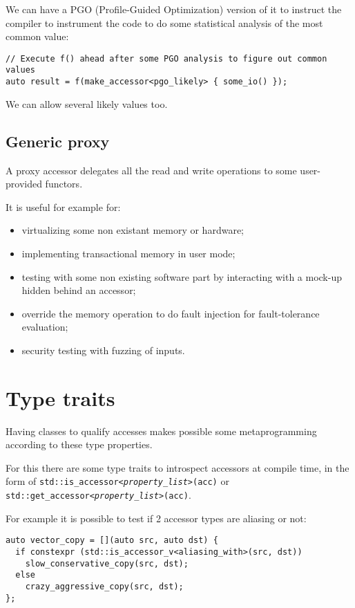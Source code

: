 \documentclass[a4paper]{article}
\begin{document}
We can have a PGO (Profile-Guided Optimization) version of it to
instruct the compiler to instrument the code to do some statistical
analysis of the most common value:
\begin{lstlisting}
// Execute f() ahead after some PGO analysis to figure out common values
auto result = f(make_accessor<pgo_likely> { some_io() });
\end{lstlisting}

We can allow several likely values too.


\subsection{Generic proxy}
\label{sec:generic-proxy}

A proxy accessor delegates all the read and write operations to some
user-provided functors.

It is useful for example for:
\begin{itemize}
\item virtualizing some non existant memory or hardware;
\item implementing transactional memory in user mode;
\item testing with some non existing software part by interacting with
  a mock-up hidden behind an accessor;
\item override the memory operation to do fault injection for
  fault-tolerance evaluation;
\item security testing with fuzzing of inputs.
\end{itemize}


\section{Type traits}
\label{sec:type-traits}

Having classes to qualify accesses makes possible some metaprogramming
according to these type properties.

For this there are some type traits to introspect accessors at compile
time, in the form of
\texttt{std::is\_accessor<\emph{property\_list}>(acc)} or
\texttt{std::get\_accessor<\emph{property\_list}>(acc)}.

For example it is possible to test if 2 accessor types are aliasing or
not:
\begin{lstlisting}
auto vector_copy = [](auto src, auto dst) {
  if constexpr (std::is_accessor_v<aliasing_with>(src, dst))
    slow_conservative_copy(src, dst);
  else
    crazy_aggressive_copy(src, dst);
};
\end{lstlisting}
\end{document}
